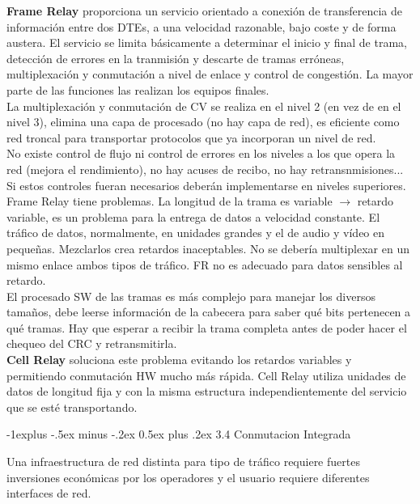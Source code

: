 \documentclass[10pt,portrait, twocolumn]{article}
\makeatletter
\renewcommand{\subsection}{\@startsection{subsection}{2}{0mm}%
                                {-1explus -.5ex minus -.2ex}%
                                {0.5ex plus .2ex}%
                                {\normalfont\normalsize\bfseries}}
\makeatother
\begin{document}
\textbf{Frame Relay} proporciona un servicio orientado a conexión de transferencia de información entre dos DTEs, a una velocidad razonable, bajo coste y de forma austera. El servicio se limita básicamente a determinar el inicio y final de trama, detección de errores en la tranmisión y descarte de tramas erróneas, multiplexación y conmutación a nivel de enlace y control de congestión. La mayor parte de las funciones las realizan los equipos finales.\\
\quad La multiplexación y conmutación de CV se realiza en el nivel 2 (en vez de en el nivel 3), elimina una capa de procesado (no hay capa de red), es eficiente como red troncal para transportar protocolos que ya incorporan un nivel de red.\\
\quad No existe control de flujo ni control de errores en los niveles a los que opera la red (mejora el rendimiento), no hay acuses de recibo, no hay retransnmisiones... Si estos controles fueran necesarios deberán implementarse en niveles superiores.\\
\quad Frame Relay tiene problemas. La longitud de la trama es variable $\rightarrow$ retardo variable, es un problema para la entrega de datos a velocidad constante. El tráfico de datos, normalmente, en unidades grandes y el de audio y vídeo en pequeñas. Mezclarlos crea retardos inaceptables. No se debería multiplexar en un mismo enlace ambos tipos de tráfico. FR no es adecuado para datos sensibles al retardo.\\
\quad El procesado SW de las tramas es más complejo para manejar los diversos tamaños, debe leerse información de la cabecera para saber qué bits pertenecen a qué tramas. Hay que esperar a recibir la trama completa antes de poder hacer el chequeo del CRC y retransmitirla.\\
\quad \textbf{Cell Relay} soluciona este problema evitando los retardos variables y permitiendo conmutación HW mucho más rápida. Cell Relay utiliza unidades de datos de longitud fija y con la misma estructura independientemente del servicio que se esté transportando.

\subsection{3.4 Conmutacion Integrada}

Una infraestructura de red distinta para tipo de tráfico requiere fuertes inversiones económicas por los operadores y el usuario requiere diferentes interfaces de red.
\end{document}
